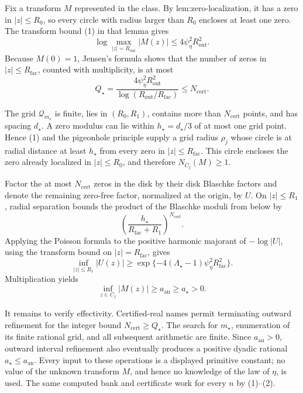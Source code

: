 Fix a transform \(M\) represented in the class.  By \(\text{lem:zero-localization}\), it has a zero in \(|z|\le R_0\), so every circle with radius larger than \(R_0\) encloses at least one zero.  The transform bound (1) in that lemma gives
\[
 \log\max_{|z|=R_{\mathrm{out}}}|M(z)|
 \le4\psi_{\eta}^2R_{\mathrm{out}}^2.
\]
Because \(M(0)=1\), Jensen's formula shows that the number of zeros in \(|z|\le R_{\mathrm{fac}}\), counted with multiplicity, is at most
\[
 Q_{\star}
 =\frac{4\psi_{\eta}^2R_{\mathrm{out}}^2}
        {\log(R_{\mathrm{out}}/R_{\mathrm{fac}})}
 \le N_{\mathrm{cert}}. \tag{1}
\]

The grid \(\mathcal Q_{m_{\star}}\) is finite, lies in \((R_0,R_1)\), contains more than \(N_{\mathrm{cert}}\) points, and has spacing \(d_{\star}\).  A zero modulus can lie within \(h_{\star}=d_{\star}/3\) of at most one grid point.  Hence (1) and the pigeonhole principle supply a grid radius \(\rho_j\) whose circle is at radial distance at least \(h_{\star}\) from every zero in \(|z|\le R_{\mathrm{fac}}\).  This circle encloses the zero already localized in \(|z|\le R_0\), and therefore \(N_{C_j}(M)\ge1\).

Factor the at most \(N_{\mathrm{cert}}\) zeros in the disk by their disk Blaschke factors and denote the remaining zero-free factor, normalized at the origin, by \(U\).  On \(|z|\le R_1\), radial separation bounds the product of the Blaschke moduli from below by
\[
 \left(\frac{h_{\star}}{R_{\mathrm{fac}}+R_1}\right)^{N_{\mathrm{cert}}}.
\]
Applying the Poisson formula to the positive harmonic majorant of \(-\log|U|\), using the transform bound on \(|z|=R_{\mathrm{fac}}\), gives
\[
 \inf_{|z|\le R_1}|U(z)|
 \ge
 \exp\{-4(\Lambda_{\star}-1)\psi_{\eta}^2R_{\mathrm{fac}}^2\}.
\]
Multiplication yields
\[
 \inf_{z\in C_j}|M(z)|\ge a_{\mathrm{an}}\ge a_{\star}>0. \tag{2}
\]

It remains to verify effectivity.  Certified-real names permit terminating outward refinement for the integer bound \(N_{\mathrm{cert}}\ge Q_{\star}\).  The search for \(m_{\star}\), enumeration of its finite rational grid, and all subsequent arithmetic are finite.  Since \(a_{\mathrm{an}}>0\), outward interval refinement also eventually produces a positive dyadic rational \(a_{\star}\le a_{\mathrm{an}}\).  Every input to these operations is a displayed primitive constant; no value of the unknown transform \(M\), and hence no knowledge of the law of \(\eta\), is used.  The same computed bank and certificate work for every \(n\) by (1)--(2).